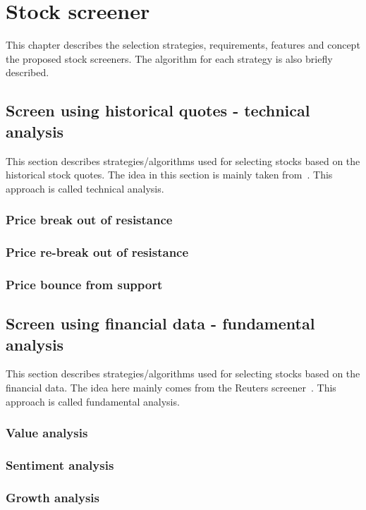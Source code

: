 \chapter{Stock screener}
\label{chap:screener}

This chapter describes the selection strategies, requirements, features and concept the proposed stock screeners. The algorithm for each strategy is also briefly described. 

\section{Screen using historical quotes - technical analysis}
\label{sec-screen-historical}
This section describes strategies/algorithms used for selecting stocks based on the historical stock quotes. The idea in this section is mainly taken from~\cite{xxx}. This approach is called technical analysis. 

\subsection{Price break out of resistance}
\subsection{Price re-break out of resistance}
\subsection{Price bounce from support}

\section{Screen using financial data - fundamental analysis}
This section describes strategies/algorithms used for selecting stocks based on the financial data. The idea here mainly comes from the Reuters screener~\cite{xxx}. This approach is called fundamental analysis. 
\subsection{Value analysis}
\subsection{Sentiment analysis}
\subsection{Growth analysis}
